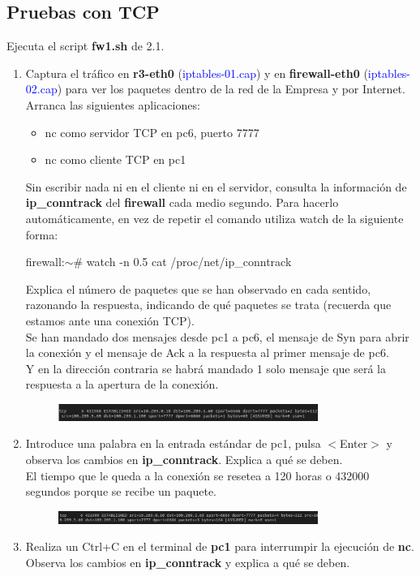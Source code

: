 \documentclass[12pt, a4paper]{report}
\begin{document}
\subsection{Pruebas con TCP}
Ejecuta el script \textbf{fw1.sh} de 2.1.
\begin{enumerate}
	\item Captura el tráfico en \textbf{r3-eth0} (\textcolor{blue}{iptables-01.cap}) y en \textbf{firewall-eth0} (\textcolor{blue}{iptables-02.cap}) para
	ver los paquetes dentro de la red de la Empresa y por Internet. Arranca las siguientes aplicaciones:
	\begin{itemize}
		\item nc como servidor TCP en pc6, puerto 7777
		\item nc como cliente TCP en pc1
	\end{itemize}
	Sin escribir nada ni en el cliente ni en el servidor, consulta la información de\textbf{ ip\_conntrack}
	del \textbf{firewall} cada medio segundo. Para hacerlo automáticamente, en vez de repetir el comando
	utiliza watch de la siguiente forma:
	\begin{center}
		firewall:$\sim$\# watch -n 0.5 cat /proc/net/ip\_conntrack
	\end{center}
	Explica el número de paquetes que se han observado en cada sentido, razonando la respuesta,
	indicando de qué paquetes se trata (recuerda que estamos ante una conexión TCP).\\
	
	Se han mandado dos mensajes desde pc1 a pc6, el mensaje de Syn para abrir la conexión y el mensaje de Ack a la respuesta al primer mensaje de pc6.\\
	Y en la dirección contraria se habrá mandado 1 solo mensaje que será la respuesta a la apertura de la conexión.
	\begin{figure}[h]
		\centering
		\includegraphics[width=0.8\textwidth]{ej2.1.1_1}
	\end{figure}
	\item Introduce una palabra en la entrada estándar de pc1, pulsa $<$Enter$>$ y observa los cambios en
	\textbf{ip\_conntrack}. Explica a qué se deben.\\
	
	El tiempo que le queda a la conexión se resetea a 120 horas o 432000 segundos porque se recibe un paquete.
	\begin{figure}[h]
		\centering
		\includegraphics[width=0.8\textwidth]{ej2.1.1_2}
	\end{figure}
	\item Realiza un Ctrl+C en el terminal de \textbf{pc1} para interrumpir la ejecución de \textbf{nc}. Observa los cambios
	en \textbf{ip\_conntrack }y explica a qué se deben.\\
	

\end{enumerate}
\end{document}
